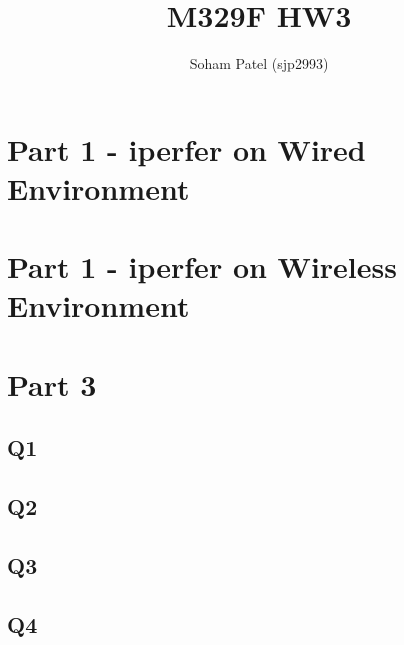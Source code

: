 \documentclass{article}
\title{M329F HW3}
\begin{document}
    \author{Soham Patel (sjp2993)}
    \maketitle{}
    \section{Part 1 - iperfer on Wired Environment}
    
    \section{Part 1 - iperfer on Wireless Environment}
    \section{Part 3}
    \subsection{Q1}
    \subsection{Q2}
    \subsection{Q3}
    \subsection{Q4}
\end{document}
